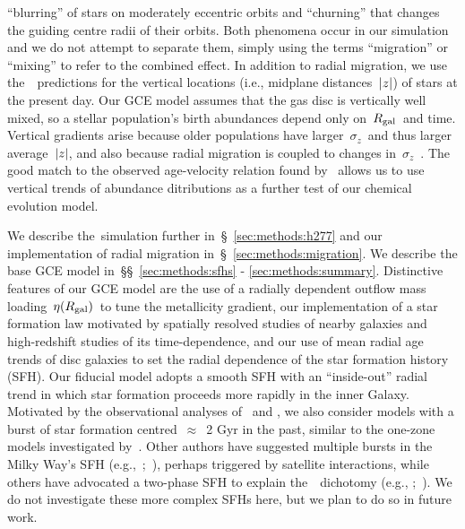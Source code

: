 \documentclass[draft2.tex]{subfiles}
\begin{document}
``blurring'' of stars on moderately eccentric orbits and ``churning'' that 
changes the guiding centre radii of their orbits. 
Both phenomena occur in our simulation and we do not attempt to separate them, 
simply using the terms ``migration'' or ``mixing'' to refer to the combined 
effect. 
In addition to radial migration, we use the~\hsim~predictions for the vertical 
locations (i.e., midplane distances~$\left|z\right|$) of stars at the present day. 
Our GCE model assumes that the gas disc is vertically well mixed, so a stellar 
population's birth abundances depend only on~$R_\text{gal}$~and time. 
Vertical gradients arise because older populations have larger~$\sigma_z$~and 
thus larger average~$\left|z\right|$, and also because radial migration is 
coupled to changes in~$\sigma_z$~\citep*{Solway2012}. 
The good match to the observed age-velocity relation found by~\citet{Bird2021} 
allows us to use vertical trends of abundance ditributions as a further test 
of our chemical evolution model. 
\par 
We describe the~\hsim simulation further in~\S~\ref{sec:methods:h277} and our 
implementation of radial migration in~\S~\ref{sec:methods:migration}. 
We describe the base GCE model in~\S\S~\ref{sec:methods:sfhs} - 
\ref{sec:methods:summary}. Distinctive features of our GCE model are the use 
of a radially dependent outflow mass loading~$\eta(R_\text{gal})$~to tune the 
metallicity gradient, our implementation of a star formation law motivated by 
spatially resolved studies of nearby galaxies and high-redshift studies of its 
time-dependence, and our use of mean radial age trends of disc galaxies to set 
the radial dependence of the star formation history (SFH). 
Our fiducial model adopts a smooth SFH with an ``inside-out'' radial trend in 
which star formation proceeds more rapidly in the inner Galaxy. 
Motivated by the observational analyses of~\citet{Isern2019} and 
\citet{Mor2019}, we also consider models with a burst of star formation 
centred~$\approx$~2 Gyr in the past, similar to the one-zone models 
investigated by~\citet{Johnson2020}. 
Other authors have suggested multiple bursts in the Milky Way's SFH 
(e.g.,~\citealp*{Lian2020a, Lian2020b};~\citealp{RuizLara2020, 
Sysoliatina2021}), perhaps triggered by satellite interactions, while others 
have advocated a two-phase SFH to explain the~\afe~dichotomy (e.g., 
\citealp*{Chiappini1997};~\citealp{Haywood2016, Mackereth2018, Spitoni2019a, 
Buck2020a, Khoperskov2021}). We do not investigate these more complex SFHs 
here, but we plan to do so in future work. 
\end{document}
